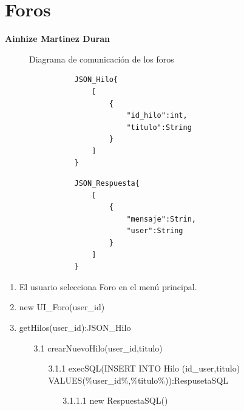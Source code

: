 ﻿\documentclass{report}
\begin{document}
        \section{Foros}
            \textbf{Ainhize Martinez Duran}
            \begin{figure}[H]
                \centering
                \caption{Diagrama de comunicación de los foros}
            \end{figure}
            \begin{verbatim}
                JSON_Hilo{
                    [
                        {
                            "id_hilo":int,
                            "titulo":String
                        }
                    ]
                }
            \end{verbatim}
            \begin{verbatim}
                JSON_Respuesta{
                    [
                        {
                            "mensaje":Strin,
                            "user":String
                        }
                    ]
                }
            \end{verbatim}
            \begin{enumerate}
                \item El usuario selecciona Foro en el menú principal.
                \item new UI\_Foro(user\_id)
                \item getHilos(user\_id):JSON\_Hilo
                \begin{enumerate}
                    \item [3.1] crearNuevoHilo(user\_id,titulo)
                    \begin{enumerate}
                        \item [3.1.1] execSQL(INSERT INTO Hilo (id\_user,titulo) VALUES(\%user\_id\%,\%titulo\%)):RespusetaSQL
                        \begin{enumerate}
                            \item [3.1.1.1] new RespuestaSQL()
                        \end{enumerate}
                    \end{enumerate}
                \end{enumerate}
            \end{enumerate}
            
\end{document}
